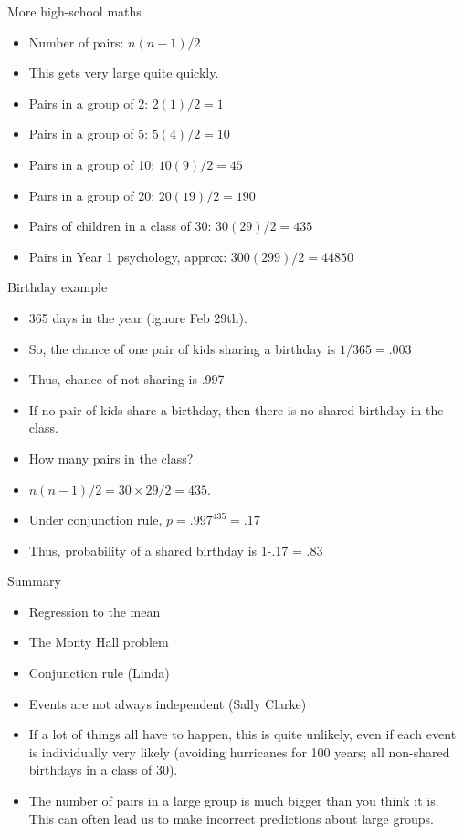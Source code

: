 \documentclass{beamer}
\begin{document}
\begin{frame}{More high-school maths}
\begin{itemize}
\item Number of pairs: $n(n-1)/2$
\item This gets very large quite quickly.
\item Pairs in a group of 2: $2(1)/2 = 1$
\item Pairs in a group of 5: $5(4)/2 = 10$
\item Pairs in a group of 10: $10(9)/2 = 45$
\item Pairs in a group of 20: $20(19)/2 = 190$
\item Pairs of children in a class of 30: $30(29)/2 = 435$
\item Pairs in Year 1 psychology, approx: $300(299)/2 = 44850$
\end{itemize}
\end{frame}

\begin{frame}{Birthday example}
	\begin{itemize} 
		\item 365 days in the year (ignore Feb 29th).
		\item So, the chance of one pair of kids sharing a birthday is $1/365 = .003$
		\item Thus, chance of not sharing is .997
		\item If no pair of kids share a birthday, then there is no shared birthday in the class.
		\item How many pairs in the class?
		\item $n(n-1)/2 = 30 \times 29/2 = 435$.	
		\item Under conjunction rule, $p = .997^{435} = .17$
		\item Thus, probability of a shared birthday is 1-.17 = .83	
	\end{itemize}
\end{frame}

\begin{frame}{Summary}
\begin{itemize}
\item Regression to the mean
\item The Monty Hall problem
\item Conjunction rule (Linda)
\item Events are not always independent (Sally Clarke)
\item If a lot of things all have to happen, this is quite unlikely, even if each event is individually very likely (avoiding hurricanes for 100 years; all non-shared birthdays in a class of 30).
\item The number of pairs in a large group is much bigger than you think it is. This can often lead us to make incorrect predictions about large groups. 
\end{itemize}
\end{frame}
\end{document}
